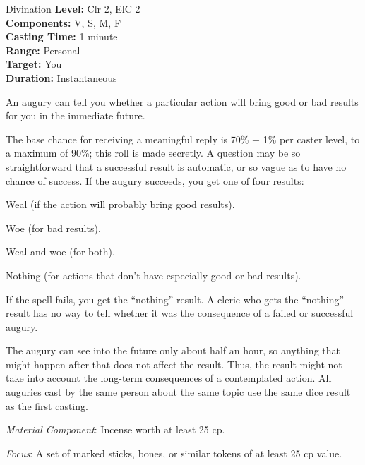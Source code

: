 {Divination}
{
	\textbf{Level:}
	Clr 2, ElC 2\\
	\textbf{Components:}
	V, S, M, F\\
	\textbf{Casting Time:}
	1 minute\\
	\textbf{Range:}
	Personal\\
	\textbf{Target:}
	You\\
	\textbf{Duration:}
	Instantaneous\\
}
{
	An augury can tell you whether a particular action will bring good or bad results for you in the immediate future.

	The base chance for receiving a meaningful reply is 70\% + 1\% per caster level, to a maximum of 90\%; this roll is made secretly. A question may be so straightforward that a successful result is automatic, or so vague as to have no chance of success. If the augury succeeds, you get one of four results:

\begin{itemize*}
\item Weal (if the action will probably bring good results).
\item Woe (for bad results).
\item Weal and woe (for both).
\item Nothing (for actions that don't have especially good or bad results).
\end{itemize*}

	If the spell fails, you get the ``nothing'' result. A cleric who gets the ``nothing'' result has no way to tell whether it was the consequence of a failed or successful augury.

	The augury can see into the future only about half an hour, so anything that might happen after that does not affect the result. Thus, the result might not take into account the long-term consequences of a contemplated action. All auguries cast by the same person about the same topic use the same dice result as the first casting.

	\textit{Material Component}:
	Incense worth at least 25 cp.

	\textit{Focus}:
	A set of marked sticks, bones, or similar tokens of at least 25 cp value.

}

